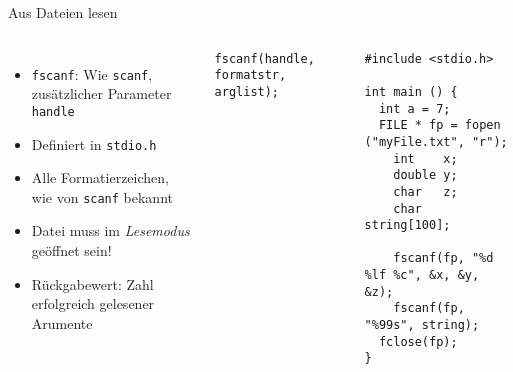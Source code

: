 
\begin{frame}[fragile]{Aus Dateien lesen}
%
\begin{columns}[T]
%
\begin{itemize}
\item \texttt{fscanf}: Wie \texttt{scanf}, zusätzlicher Parameter \texttt{handle}
\item Definiert in \texttt{stdio.h}
\item Alle Formatierzeichen, wie von \texttt{scanf} bekannt
\item Datei muss im \emph{Lesemodus} geöffnet sein!
\item Rückgabewert: Zahl erfolgreich gelesener Arumente
\end{itemize}
%
\begin{codebox}[Syntax]
\begin{verbatim}
fscanf(handle, formatstr, arglist);
\end{verbatim}
\end{codebox}
%
\begin{codebox}[Beispiel]
\begin{verbatim}
#include <stdio.h>

int main () {
  int a = 7;
  FILE * fp = fopen ("myFile.txt", "r");
    int    x;
    double y;
    char   z;
    char string[100];
  
    fscanf(fp, "%d %lf %c", &x, &y, &z);
    fscanf(fp, "%99s", string);
  fclose(fp);
}
\end{verbatim}
\end{codebox}
\end{columns}
%
\end{frame}


